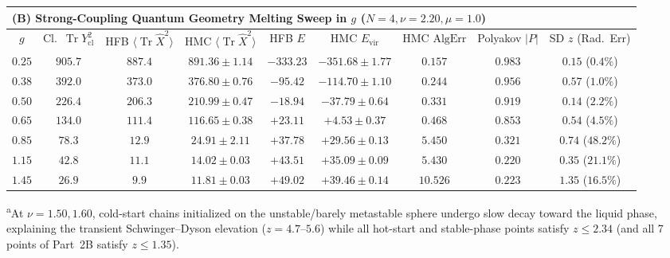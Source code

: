 \documentclass[11pt,a4paper]{article}
\DeclareMathOperator{\Tr}{Tr}
\begin{document}
\begin{table}[H]
{\begin{tabular}{@{}ccccccccc@{}}
    \midrule
    \multicolumn{9}{l}{\textbf{(B) Strong-Coupling Quantum Geometry Melting Sweep in $g$ ($N=4, \nu=2.20, \mu=1.0$)}} \\
    \midrule
    $g$ & Cl.\ $\Tr Y_{\mathrm{cl}}^2$ & HFB $\langle\Tr\hat{X}^2\rangle$ & HMC $\langle\Tr\hat{X}^2\rangle$ & HFB $E$ & HMC $E_{\mathrm{vir}}$ & HMC $\mathrm{AlgErr}$ & Polyakov $|P|$ & SD $z$ (Rad.\ Err) \\
    \midrule
    $0.25$ & $905.7$ & $887.4$ & $891.36 \pm 1.14$ & $-333.23$ & $-351.68 \pm 1.77$ & $0.157$ & $0.983$ & $0.15$ ($0.4\%$) \\
    $0.38$ & $392.0$ & $373.0$ & $376.80 \pm 0.76$ & $-95.42$  & $-114.70 \pm 1.10$ & $0.244$ & $0.956$ & $0.57$ ($1.0\%$) \\
    $0.50$ & $226.4$ & $206.3$ & $210.99 \pm 0.47$ & $-18.94$  & $-37.79 \pm 0.64$  & $0.331$ & $0.919$ & $0.14$ ($2.2\%$) \\
    $0.65$ & $134.0$ & $111.4$ & $116.65 \pm 0.38$ & $+23.11$  & $+4.53 \pm 0.37$   & $0.468$ & $0.853$ & $0.54$ ($4.5\%$) \\
    $0.85$ & $78.3$  & $12.9$  & $24.91 \pm 2.11$  & $+37.78$  & $+29.56 \pm 0.13$  & $5.450$ & $0.321$ & $0.74$ (\textbf{$48.2\%$}) \\
    $1.15$ & $42.8$  & $11.1$  & $14.02 \pm 0.03$  & $+43.51$  & $+35.09 \pm 0.09$  & $5.430$ & $0.220$ & $0.35$ ($21.1\%$) \\
    $1.45$ & $26.9$  & $9.9$   & $11.81 \pm 0.03$  & $+49.02$  & $+39.46 \pm 0.14$  & $10.526$ & $0.223$ & $1.35$ ($16.5\%$) \\
    \bottomrule
  \end{tabular}%
  }
  \vspace{2pt}
  {\footnotesize \textsuperscript{a}At $\nu=1.50, 1.60$, cold-start chains initialized on the unstable/barely metastable sphere undergo slow decay toward the liquid phase, explaining the transient Schwinger--Dyson elevation ($z=4.7$--$5.6$) while all hot-start and stable-phase points satisfy $z \le 2.34$ (and all 7 points of Part~2B satisfy $z \le 1.35$).}
\end{table}
\end{document}
